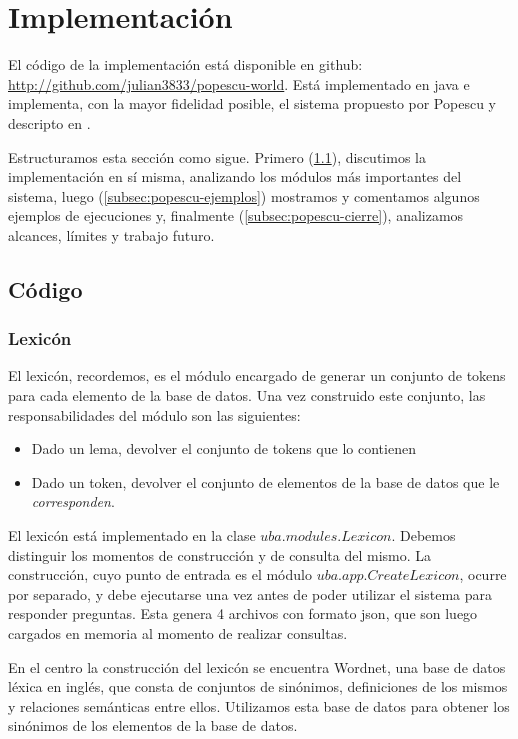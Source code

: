 \section{Implementación}
\label{sec:popescu-implementacion}

El código de la implementación está disponible en github: \url{http://github.com/julian3833/popescu-world}. Está implementado en java e implementa, con la mayor fidelidad posible, el sistema propuesto por Popescu y descripto en .

Estructuramos esta sección como sigue. Primero (\ref{subsec:popescu-codigo}), discutimos la implementación en sí misma, analizando los módulos más importantes del sistema, luego (\ref{subsec:popescu-ejemplos}) mostramos y comentamos algunos ejemplos de ejecuciones y, finalmente (\ref{subsec:popescu-cierre}), analizamos alcances, límites y trabajo futuro.

\subsection{Código}
\label{subsec:popescu-codigo}

\subsubsection*{Lexicón}
\label{subsubsec:lexicon}
El lexicón, recordemos, es el módulo encargado de generar un conjunto de tokens para cada  elemento de la base de datos. Una vez construido este conjunto, las responsabilidades del módulo son las siguientes:
\begin{itemize}
	\item Dado un lema, devolver el conjunto de tokens que lo contienen
	\item Dado un token, devolver el conjunto de elementos de la base de datos que le \textit{corresponden}.
\end{itemize}

El lexicón está implementado en la clase $uba.modules.Lexicon$. Debemos distinguir los momentos de construcción y de consulta del mismo. La construcción, cuyo punto de entrada es el módulo $uba.app.CreateLexicon$, ocurre por separado, y debe ejecutarse una vez antes de poder utilizar el sistema para responder preguntas. Esta genera 4 archivos con formato json, que son luego cargados en memoria al momento de realizar consultas.

En el centro la construcción del lexicón se encuentra Wordnet, una base de datos léxica en inglés, que consta de conjuntos de sinónimos, definiciones de los mismos y relaciones semánticas entre ellos. Utilizamos esta base de datos para obtener los sinónimos de los elementos de la base de datos.

